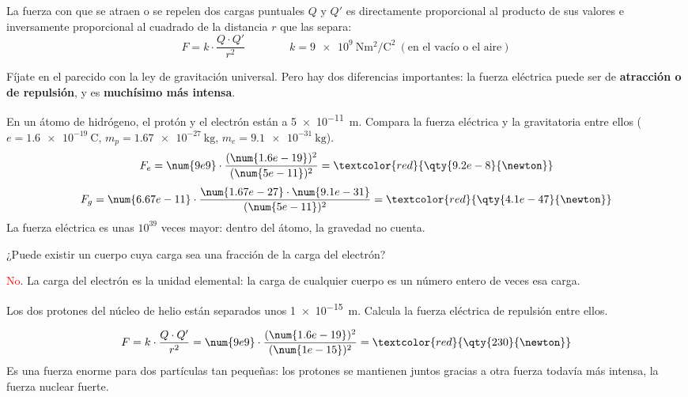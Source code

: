 \begin{definition}
    La fuerza con que se atraen o se repelen dos cargas puntuales \(Q\) y \(Q'\) es directamente proporcional al producto de sus valores e inversamente proporcional al cuadrado de la distancia \(r\) que las separa:
    \[ F = k \cdot \frac{Q \cdot Q'}{r^2} \qquad\qquad k = \qty{9e9}{\newton\square\m\per\square\coulomb} \ (\text{en el vacío o el aire}) \]
\end{definition}

Fíjate en el parecido con la ley de gravitación universal. Pero hay dos diferencias importantes: la fuerza eléctrica puede ser de \textbf{atracción o de repulsión}, y es \textbf{muchísimo más intensa}.

\begin{example}
    En un átomo de hidrógeno, el protón y el electrón están a \qty{5e-11}{\m}. Compara la fuerza eléctrica y la gravitatoria entre ellos (\(e = \qty{1.6e-19}{\coulomb}\), \(m_p = \qty{1.67e-27}{\kg}\), \(m_e = \qty{9.1e-31}{\kg}\)).
    \[ F_e = \num{9e9} \cdot \frac{(\num{1.6e-19})^2}{(\num{5e-11})^2} = \textcolor{red}{\qty{9.2e-8}{\newton}} \]
    \[ F_g = \num{6.67e-11} \cdot \frac{\num{1.67e-27} \cdot \num{9.1e-31}}{(\num{5e-11})^2} = \textcolor{red}{\qty{4.1e-47}{\newton}} \]
    La fuerza eléctrica es unas \(10^{39}\) veces mayor: dentro del átomo, la gravedad no cuenta.
\end{example}

\begin{exercise}
    ¿Puede existir un cuerpo cuya carga sea una fracción de la carga del electrón?
    \begin{solu}
        \textcolor{red}{No}. La carga del electrón es la unidad elemental: la carga de cualquier cuerpo es un número entero de veces esa carga.
    \end{solu}
\end{exercise}

\begin{exercise}
    Los dos protones del núcleo de helio están separados unos \qty{1e-15}{\m}. Calcula la fuerza eléctrica de repulsión entre ellos.
    \begin{solu}
        \[ F = k \cdot \frac{Q \cdot Q'}{r^2} = \num{9e9} \cdot \frac{(\num{1.6e-19})^2}{(\num{1e-15})^2} = \textcolor{red}{\qty{230}{\newton}} \]
        Es una fuerza enorme para dos partículas tan pequeñas: los protones se mantienen juntos gracias a otra fuerza todavía más intensa, la fuerza nuclear fuerte.
    \end{solu}
\end{exercise}

